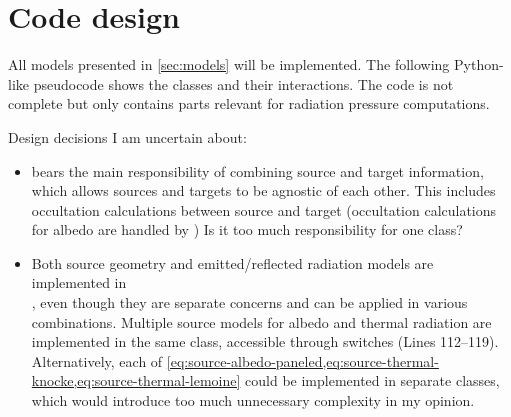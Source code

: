 \documentclass[parskip=full,DIV=15]{scrartcl}
\begin{document}
\section{Code design}
All models presented in \cref{sec:models} will be implemented. The following Python-like pseudocode shows the classes and their interactions. The code is not complete but only contains parts relevant for radiation pressure computations.

Design decisions I am uncertain about:
\begin{itemize}
   \item {} bears the main responsibility of combining source and target information, which allows sources and targets to be agnostic of each other. This includes occultation calculations between source and target (occultation calculations for albedo are handled by ) Is it too much responsibility for one class?
   \item Both source geometry and emitted/reflected radiation models are implemented in \\ , even though they are separate concerns and can be applied in various combinations. Multiple source models for albedo and thermal radiation are implemented in the same class, accessible through switches (Lines 112--119). Alternatively, each of \cref{eq:source-albedo-paneled,eq:source-thermal-knocke,eq:source-thermal-lemoine} could be implemented in separate classes, which would introduce too much unnecessary complexity in my opinion.
\end{itemize}

\inputminted{python}{code_design.py}
\end{document}
